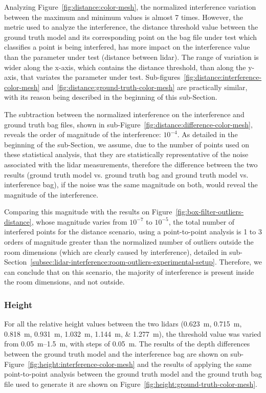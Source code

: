Analyzing Figure~\ref{fig:distance:color-mesh}, the normalized interference variation between the maximum and minimum values is almost 7 times. However, the metric used to analyze the interference, the distance threshold value between the ground truth model and its corresponding point on the bag file under test which classifies a point is being interfered, has more impact on the interference value than the parameter under test (distance between \ac{lidar}). The range of variation is wider along the x-axis, which contains the distance threshold, than along the y-axis, that variates the parameter under test. Sub-figures~\ref{fig:distance:interference-color-mesh} and~\ref{fig:distance:ground-truth-color-mesh} are practically similar, with its reason being described in the beginning of this sub-Section.

The subtraction between the normalized interference on the interference and ground truth bag files, shown in sub-Figure~\ref{fig:distance:difference-color-mesh}, reveals the order of magnitude of the interference: $10^{-4}$. As detailed in the beginning of the sub-Section, we assume, due to the number of points used on these statistical analysis, that they are statistically representative of the noise associated with the \ac{lidar} measurements, therefore the difference between the two results (ground truth model vs. ground truth bag and ground truth model vs. interference bag), if the noise was the same magnitude on both, would reveal the magnitude of the interference. 

Comparing this magnitude with the results on Figure~\ref{fig:box-filter-outliers-distance}, whose magnitude varies from $10^{-7}$ to $10^{-5}$, the total number of interfered points for the distance scenario, using a point-to-point analysis is 1 to 3 orders of magnitude greater than the normalized number of outliers outside the room dimensions (which are clearly caused by interference), detailed in sub-Section~\ref{subsec:lidar-interference:room-outliers-experimental-setup}. Therefore, we can conclude that on this scenario, the majority of interference is present inside the room dimensions, and not outside.

\subsubsection{Height}
For all the relative height values between the two \acp{lidar} (\SIlist[list-units=single]{0.623; 0.715; 0.818; 0.931; 1.032; 1.144; 1.277}{\meter}), the threshold value was varied from \SIrange{0.05}{1.5}{\meter}, with steps of \SI{0.05}{\meter}. The results of the depth differences between the ground truth model and the interference bag are shown on sub-Figure~\ref{fig:height:interference-color-mesh} and the results of applying the same point-to-point analysis between the ground truth model and the ground truth bag file used to generate it are shown on Figure~\ref{fig:height:ground-truth-color-mesh}.


